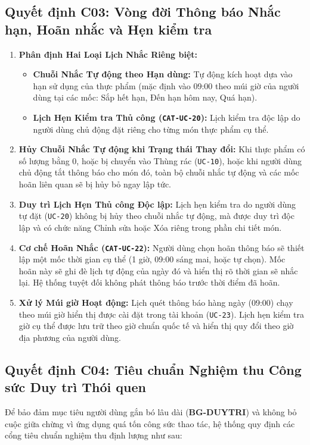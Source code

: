 \documentclass[10pt,a4paper]{article}
\begin{document}
\subsection{Quyết định C03: Vòng đời Thông báo Nhắc hạn, Hoãn nhắc và Hẹn kiểm tra}
\begin{enumerate}[itemsep=2pt]
    \item \textbf{Phân định Hai Loại Lịch Nhắc Riêng biệt:}
    \begin{itemize}
        \item \textbf{Chuỗi Nhắc Tự động theo Hạn dùng:} Tự động kích hoạt dựa vào hạn sử dụng của thực phẩm (mặc định vào 09:00 theo múi giờ của người dùng tại các mốc: Sắp hết hạn, Đến hạn hôm nay, Quá hạn).
        \item \textbf{Lịch Hẹn Kiểm tra Thủ công (\texttt{CAT-UC-20}):} Lịch kiểm tra độc lập do người dùng chủ động đặt riêng cho từng món thực phẩm cụ thể.
    \end{itemize}
    \item \textbf{Hủy Chuỗi Nhắc Tự động khi Trạng thái Thay đổi:} Khi thực phẩm có số lượng bằng 0, hoặc bị chuyển vào Thùng rác (\texttt{UC-10}), hoặc khi người dùng chủ động tắt thông báo cho món đó, toàn bộ chuỗi nhắc tự động và các mốc hoãn liên quan sẽ bị hủy bỏ ngay lập tức.
    \item \textbf{Duy trì Lịch Hẹn Thủ công Độc lập:} Lịch hẹn kiểm tra do người dùng tự đặt (\texttt{UC-20}) không bị hủy theo chuỗi nhắc tự động, mà được duy trì độc lập và có chức năng Chỉnh sửa hoặc Xóa riêng trong phần chi tiết món.
    \item \textbf{Cơ chế Hoãn Nhắc (\texttt{CAT-UC-22}):} Người dùng chọn hoãn thông báo sẽ thiết lập một mốc thời gian cụ thể (1 giờ, 09:00 sáng mai, hoặc tự chọn). Mốc hoãn này sẽ ghi đè lịch tự động của ngày đó và hiển thị rõ thời gian sẽ nhắc lại. Hệ thống tuyệt đối không phát thông báo trước thời điểm đã hoãn.
    \item \textbf{Xử lý Múi giờ Hoạt động:} Lịch quét thông báo hàng ngày (09:00) chạy theo múi giờ hiển thị được cài đặt trong tài khoản (\texttt{UC-23}). Lịch hẹn kiểm tra giờ cụ thể được lưu trữ theo giờ chuẩn quốc tế và hiển thị quy đổi theo giờ địa phương của người dùng.
\end{enumerate}

\subsection{Quyết định C04: Tiêu chuẩn Nghiệm thu Công sức Duy trì Thói quen}
Để bảo đảm mục tiêu người dùng gắn bó lâu dài (\textbf{BG-DUYTRI}) và không bỏ cuộc giữa chừng vì ứng dụng quá tốn công sức thao tác, hệ thống quy định các cổng tiêu chuẩn nghiệm thu định lượng như sau:
\end{document}
